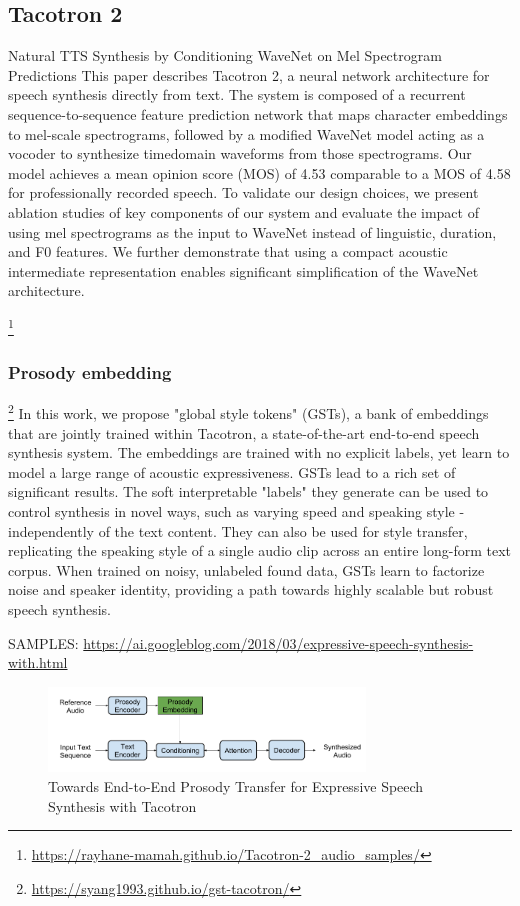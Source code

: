 \subsection{Tacotron 2}
\cite{Shen2018NaturalTS}
Natural TTS Synthesis by Conditioning WaveNet on Mel Spectrogram Predictions
This paper describes Tacotron 2, a neural network architecture for speech synthesis directly from text. The system is composed of a recurrent sequence-to-sequence feature prediction network that maps character embeddings to mel-scale spectrograms, followed by a modified WaveNet model acting as a vocoder to synthesize timedomain waveforms from those spectrograms. Our model achieves a mean opinion score (MOS) of 4.53 comparable to a MOS of 4.58 for professionally recorded speech. To validate our design choices, we present ablation studies of key components of our system and evaluate the impact of using mel spectrograms as the input to WaveNet instead of linguistic, duration, and F0 features. We further demonstrate that using a compact acoustic intermediate representation enables significant simplification of the WaveNet architecture. 

\footnote{\url{https://rayhane-mamah.github.io/Tacotron-2_audio_samples/}}

\subsubsection{Prosody embedding}
\footnote{\url{https://syang1993.github.io/gst-tacotron/}}
 In this work, we propose "global style tokens" (GSTs), a bank of embeddings that are jointly trained within Tacotron, a state-of-the-art end-to-end speech synthesis system. The embeddings are trained with no explicit labels, yet learn to model a large range of acoustic expressiveness. GSTs lead to a rich set of significant results. The soft interpretable "labels" they generate can be used to control synthesis in novel ways, such as varying speed and speaking style - independently of the text content. They can also be used for style transfer, replicating the speaking style of a single audio clip across an entire long-form text corpus. When trained on noisy, unlabeled found data, GSTs learn to factorize noise and speaker identity, providing a path towards highly scalable but robust speech synthesis. 

SAMPLES:
\url{https://ai.googleblog.com/2018/03/expressive-speech-synthesis-with.html}
\begin{figure}[]
    \centering
    \includegraphics[width=0.75\textwidth]{figures/tacotron_prosody.png}
    \caption{Towards End-to-End Prosody Transfer for Expressive Speech Synthesis with Tacotron \cite{skerry2018towards}}
    \label{fig:tts}
\end{figure}

